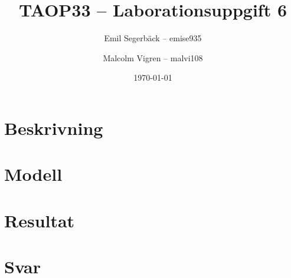 \documentclass[a4paper,titlepage,12pt]{article}
\author{Emil Segerbäck -- emise935
    \and
    Malcolm Vigren -- malvi108
    }
\title{\textbf{TAOP33 -- Laborationsuppgift 6}}
\date{\today}
\begin{document}
	\maketitle
	\newpage
\section*{Beskrivning}
\section*{Modell}
\section*{Resultat}
\section*{Svar}
\end{document}
